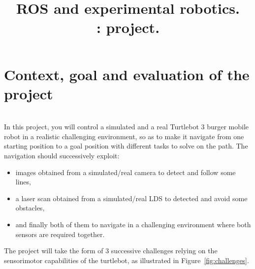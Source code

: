 \documentclass[10pt,a4paper,printanswers]{upmc}
\title{ROS and experimental robotics.\\ \Num: project.}
\newcommand{\myline}{\noindent\makebox[\linewidth]{\rule{\textwidth}{0.7pt}}}
\begin{document}
\maketitle

\section{Context, goal and evaluation of the project}
\vspace{-0.5cm}\myline\\
In this project, you will control a simulated and a real Turtlebot 3 burger mobile robot in a
realistic challenging environment, so as to make it navigate from one starting position to a goal
position with different tasks to solve on the path. The navigation should successively exploit:
\begin{itemize}
  \itemsep=-1pt
  \item images obtained from a simulated/real camera to detect and follow some lines,
  \item a laser scan obtained from a simulated/real LDS to detected and avoid some obstacles,
  \item and finally both of them to navigate in a challenging environment where both sensors are
        required together.
\end{itemize}
The project will take the form of 3 successive challenges relying on the sensorimotor capabilities
of the turtlebot, as illustrated in Figure~\ref{fig:challenges}.
%
\end{document}
